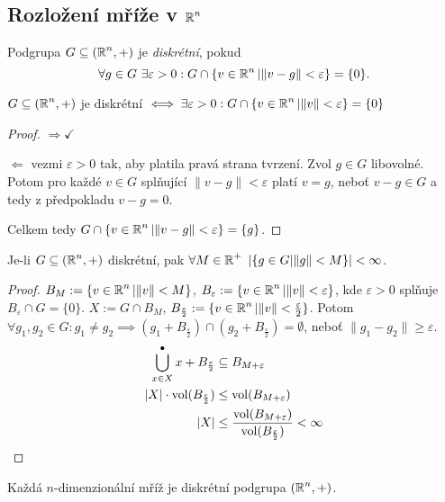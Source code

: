 \subsection{\texorpdfstring{Rozložení mříže v $\operatorname{\mathbb{R}}^n$}{Rozlození mrize v R\^\ n}}

\begin{definition}
Podgrupa $G\subseteq(\operatorname{\mathbb{R}}^n,+)$ je \emph{diskrétní}, pokud $$\forall g\in G\ \exists \varepsilon>0 :  G\cap\{v\in\Real^n|\|v-g\|<\varepsilon\}=\{0\}\text{.}$$
\end{definition}
\begin{observation}
$G\subseteq(\operatorname{\mathbb{R}}^n,+)$ je diskrétní $\iff \exists\varepsilon>0:
G\cap\{v\in\operatorname{\mathbb{R}}^n|\|v\|<\varepsilon\}=\{0\}$
\end{observation}
\begin{proof}
$\Rightarrow \checkmark$

$\Leftarrow$ vezmi $\varepsilon>0$ tak, aby platila pravá strana tvrzení. Zvol $g \in G$ libovolné. Potom pro každé $v\in G$ splňující $\|v-g\|<\varepsilon$ platí $v=g$, neboť $v-g\in G$ a tedy z předpokladu $v-g=0$.

Celkem tedy $G\cap \{v\in\operatorname{\mathbb{R}}^n|\|v-g\|<\varepsilon\}=\{g\}$.
\end{proof}

\begin{consequence}
Je-li $G\subseteq (\operatorname{\mathbb{R}}^n,+)$ diskrétní, pak $\forall M\in\operatorname{\mathbb{R}}^+\ |\{g\in G| \|g\|<M\}|<\infty$.
\end{consequence}
\begin{proof}
$B_M:=\{v\in\operatorname{\mathbb{R}}^n| \|v\|<M\}$, $B_\varepsilon:=\{v\in\operatorname{\mathbb{R}}^n| \|v\|<\varepsilon\}$, kde $\varepsilon>0$ splňuje $B_\varepsilon\cap G=\{0\}$.
$X:=G\cap B_M$, $B_{\frac{\varepsilon}{2}}:=\{v\in\operatorname{\mathbb{R}}^n| \|v\|<\frac{\varepsilon}{2}\}$. 
Potom $\forall g_1, g_2\in G: g_1\neq g_2\implies(g_1+B_{\frac{\varepsilon}{2}})\cap(g_2+B_{\frac{\varepsilon}{2}})=\emptyset $, neboť $\|g_1-g_2\|\geq \varepsilon$.
\begin{align*}
    \operatorname*{\overset{\bullet}{\bigcup}}_{x\in X} x+B_{\frac{\varepsilon}{2}}&\subseteq B_{M+\varepsilon}\\
    |X|\cdot \operatorname{vol}(B_{\frac{\varepsilon}{2}})&\leq \operatorname{vol}(B_{M+\varepsilon})\\
    |X|&\leq \frac{\operatorname{vol}(B_{M+\varepsilon})}{\operatorname{vol}(B_{\frac{\varepsilon}{2}})}<\infty\\
\end{align*}
\end{proof}

\begin{claim}
Každá $n$-dimenzionální mříž je diskrétní podgrupa $(\operatorname{\mathbb{R}}^n,+)$.
\end{claim}

